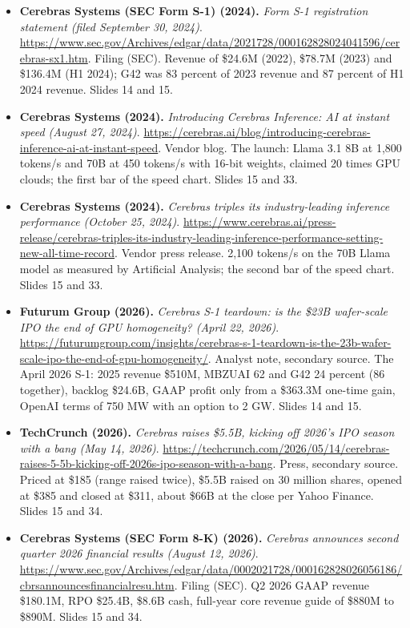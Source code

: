 \begin{itemize}[leftmargin=1.2em,itemsep=3pt]
\item \textbf{Cerebras Systems (SEC Form S-1) (2024).} \textit{Form S-1 registration statement (filed September 30, 2024)}. \url{https://www.sec.gov/Archives/edgar/data/2021728/000162828024041596/cerebras-sx1.htm}. Filing (SEC). Revenue of \$24.6M (2022), \$78.7M (2023) and \$136.4M (H1 2024); G42 was 83 percent of 2023 revenue and 87 percent of H1 2024 revenue. Slides 14 and 15.
\item \textbf{Cerebras Systems (2024).} \textit{Introducing Cerebras Inference: AI at instant speed (August 27, 2024)}. \url{https://cerebras.ai/blog/introducing-cerebras-inference-ai-at-instant-speed}. Vendor blog. The launch: Llama 3.1 8B at 1,800 tokens/s and 70B at 450 tokens/s with 16-bit weights, claimed 20 times GPU clouds; the first bar of the speed chart. Slides 15 and 33.
\item \textbf{Cerebras Systems (2024).} \textit{Cerebras triples its industry-leading inference performance (October 25, 2024)}. \url{https://www.cerebras.ai/press-release/cerebras-triples-its-industry-leading-inference-performance-setting-new-all-time-record}. Vendor press release. 2,100 tokens/s on the 70B Llama model as measured by Artificial Analysis; the second bar of the speed chart. Slides 15 and 33.
\item \textbf{Futurum Group (2026).} \textit{Cerebras S-1 teardown: is the \$23B wafer-scale IPO the end of GPU homogeneity? (April 22, 2026)}. \url{https://futurumgroup.com/insights/cerebras-s-1-teardown-is-the-23b-wafer-scale-ipo-the-end-of-gpu-homogeneity/}. Analyst note, secondary source. The April 2026 S-1: 2025 revenue \$510M, MBZUAI 62 and G42 24 percent (86 together), backlog \$24.6B, GAAP profit only from a \$363.3M one-time gain, OpenAI terms of 750 MW with an option to 2 GW. Slides 14 and 15.
\item \textbf{TechCrunch (2026).} \textit{Cerebras raises \$5.5B, kicking off 2026's IPO season with a bang (May 14, 2026)}. \url{https://techcrunch.com/2026/05/14/cerebras-raises-5-5b-kicking-off-2026s-ipo-season-with-a-bang}. Press, secondary source. Priced at \$185 (range raised twice), \$5.5B raised on 30 million shares, opened at \$385 and closed at \$311, about \$66B at the close per Yahoo Finance. Slides 15 and 34.
\item \textbf{Cerebras Systems (SEC Form 8-K) (2026).} \textit{Cerebras announces second quarter 2026 financial results (August 12, 2026)}. \url{https://www.sec.gov/Archives/edgar/data/0002021728/000162828026056186/cbrsannouncesfinancialresu.htm}. Filing (SEC). Q2 2026 GAAP revenue \$180.1M, RPO \$25.4B, \$8.6B cash, full-year core revenue guide of \$880M to \$890M. Slides 15 and 34.

\end{itemize}
